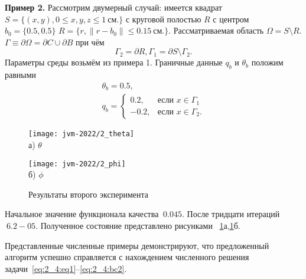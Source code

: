 \textbf{Пример 2.}
Рассмотрим двумерный случай: имеется квадрат
$S = \{(x, y), 0 \leq x,y,z \leq 1~\text{см.}\}$ с
круговой полостью $R$ с центром $b_0 =\{0.5, 0.5\}$
$R = \{r, \| r - b_0 \| \leq 0.15~\text{см.} \}$.
Рассматриваемая область $\Omega = S \setminus R$.
$\Gamma \equiv \partial \Omega = \partial C \cup \partial B$ при чём
\[
    \Gamma_2 = \partial R,
    \Gamma_1 = \partial S \setminus \Gamma_2.
\]
Параметры среды возьмём из примера 1.
Граничные данные $q_b$ и $\theta_b$ положим равными
\begin{gather*}
    \theta_b = 0.5, \\
    q_b =
    \begin{cases}
        0.2, & \text{если } x \in \Gamma_1 \\
        -0.2, & \text{если } x \in \Gamma_2.
    \end{cases}
\end{gather*}

\begin{figure}[ht]
    \begin{minipage}[b][][b]{0.49\linewidth}
        \centering
        \texttt{[image: jvm-2022/2\_theta]}
        \\ а) $\theta$
    \end{minipage}
    \hfill
    \begin{minipage}[b][][b]{0.49\linewidth}
        \centering
        \texttt{[image: jvm-2022/2\_phi]}
        \\ б) $\phi$
    \end{minipage}
    \caption{Результаты второго эксперимента}
    \label{fig:4_4:6}
\end{figure}
Начальное значение функционала качества $~0.045$.
После тридцати итераций $~6.2-05$.
Полученное состояние представлено рисунками ~\ref{fig:4_4:6}а,\ref{fig:4_4:6}б.


Представленные численные примеры демонстрируют,
что предложенный алгоритм успешно справляется
с нахождением численного решения задачи~\eqref{eq:2_4:eq1}--\eqref{eq:2_4:bc2}.

